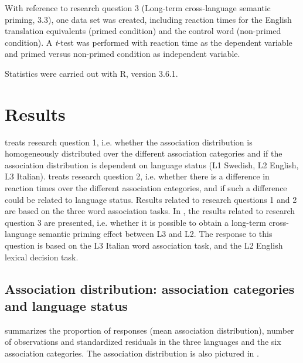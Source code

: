 \documentclass[output=paper,colorlinks,citecolor=brown,nonflat]{langsci/langscibook}
\begin{document}
 With reference to research question 3 (Long-term cross-language semantic priming, 3.3), one data set was created, including reaction times for the English translation equivalents (primed condition) and the control word (non-primed condition). A \textit{t}-test was performed with reaction time as the dependent variable and primed versus non-primed condition as independent variable.

Statistics were carried out with R, version 3.6.1.

\section{Results}\label{sec:gudmundson:3}

 treats research question 1, i.e. whether the association distribution is homogeneously distributed over the different association categories and if the association distribution is dependent on language status (L1 Swedish, L2 English, L3 Italian).  treats research question 2, i.e. whether there is a difference in reaction times over the different association categories, and if such a difference could be related to language status. Results related to research questions 1 and 2 are based on the three word association tasks. In , the results related to research question 3 are presented, i.e. whether it is possible to obtain a long-term cross-language semantic priming effect between L3 and L2. The response to this question is based on the L3 Italian word association task, and the L2 English lexical decision task.

\subsection{Association distribution: association categories and language status}\label{sec:gudmundson:3.1}

 summarizes the proportion of responses (mean association distribution), number of observations and standardized residuals in the three languages and the six association categories. The association distribution is also pictured in .
\end{document}
